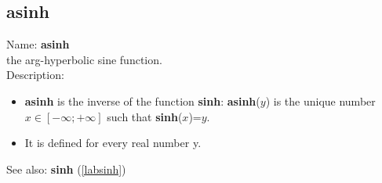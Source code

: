 \subsection{asinh}
\label{labasinh}
\noindent Name: \textbf{asinh}\\
the arg-hyperbolic sine function.\\
\noindent Description: \begin{itemize}

\item \textbf{asinh} is the inverse of the function \textbf{sinh}: \textbf{asinh}($y$) is the unique number 
   $x \in [-\infty; +\infty]$ such that \textbf{sinh}($x$)=$y$.

\item It is defined for every real number y.
\end{itemize}
See also: \textbf{sinh} (\ref{labsinh})
